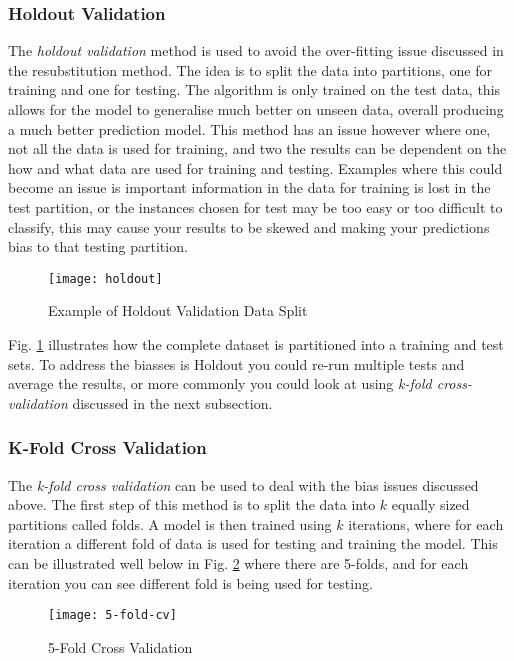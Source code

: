 \subsubsection{Holdout Validation}
The \textit{holdout validation} method is used to avoid the over-fitting issue discussed in the resubstitution method. The idea is to split the data into partitions, one for training and one for testing. The algorithm is only trained on the test data, this allows for the model to generalise much better on unseen data, overall producing a much better prediction model. This method has an issue however where one, not all the data is used for training, and two the results can be dependent on the how and what data are used for training and testing. Examples where this could become an issue is important information in the data for training is lost in the test partition, or the instances chosen for test may be too easy or too difficult to classify, this may cause your results to be skewed and making your predictions bias to that testing partition.

\begin{figure}[H]
	\texttt{[image: holdout]}
	\caption{Example of Holdout Validation Data Split}
	\label{fig:holdout}
\end{figure}

Fig. \ref{fig:holdout} illustrates how the complete dataset is partitioned into a training and test sets. To address the biasses is Holdout you could re-run multiple tests and average the results, or more commonly you could look at using \textit{k-fold cross-validation} discussed in the next subsection.

\subsubsection{K-Fold Cross Validation}\label{subsec:k_fold}
The \textit{k-fold cross validation} can be used to deal with the bias issues discussed above. The first step of this method is to split the data into $k$ equally sized partitions called folds. A model is then trained using $k$ iterations, where for each iteration a different fold of data is used for testing and training the model. This can be illustrated well below in Fig. \ref{fig:5-fold-cv} where there are 5-folds, and for each iteration you can see different fold is being used for testing.  

\begin{figure}[H]
	\texttt{[image: 5-fold-cv]}
	\caption{5-Fold Cross Validation}
	\label{fig:5-fold-cv}
\end{figure}

